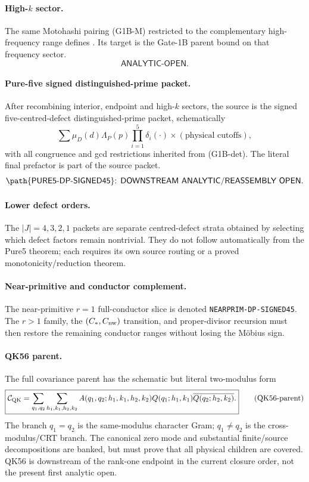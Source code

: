 \documentclass[11pt]{article}
\theoremstyle{definition}
\newcommand{\1}{\mathbf 1}
\newcommand{\status}[1]{\textsf{#1}}
\begin{document}
\paragraph{High-$k$ sector.}
The same Motohashi pairing (G1B-M) restricted to the complementary high-frequency
range defines .  Its target is the Gate-1B parent bound on that
frequency sector.
\[
\status{ANALYTIC-OPEN.}
\]

\paragraph{Pure-five signed distinguished-prime packet.}
After recombining interior, endpoint and high-$k$ sectors, the source is the signed
five-centred-defect distinguished-prime packet, schematically
\[
\sum \mu_D(d)\Lambda_P(p)
\prod_{i=1}^5\delta_i(\cdot)
\times(\text{physical cutoffs}),
\]
with all congruence and gcd restrictions inherited from (G1B-det).
The literal final prefactor is part of the source packet.
\[
\status{\path{PURE5-DP-SIGNED45}: DOWNSTREAM ANALYTIC/REASSEMBLY OPEN.}
\]

\paragraph{Lower defect orders.}
The $|J|=4,3,2,1$ packets are separate centred-defect strata obtained by selecting which
defect factors remain nontrivial.  They do not follow automatically from the Pure5 theorem;
each requires its own source routing or a proved monotonicity/reduction theorem.

\paragraph{Near-primitive and conductor complement.}
The near-primitive $r=1$ full-conductor slice is denoted
\texttt{NEARPRIM-DP-SIGNED45}.  The $r>1$ family, the
$(C_\ast,C_{\rm nw})$ transition, and proper-divisor recursion must then restore the
remaining conductor ranges without losing the M\"obius sign.

\paragraph{QK56 parent.}
The full covariance parent has the schematic but literal two-modulus form
\[
\boxed{
\mathcal C_{\rm QK}
=
\sum_{q_1,q_2}
\sum_{h_1,k_1,h_2,k_2}
A(q_1,q_2;h_1,k_1,h_2,k_2)
Q(q_1;h_1,k_1)
\overline{Q(q_2;h_2,k_2)}.
}
\tag{QK56-parent}
\]
The branch $q_1=q_2$ is the same-modulus character Gram; $q_1\ne q_2$ is the
cross-modulus/CRT branch.  The canonical zero mode and substantial finite/source
decompositions are banked, but  must prove that all physical
children are covered.  QK56 is downstream of the rank-one endpoint in the current
closure order, not the present first analytic open.
\end{document}
